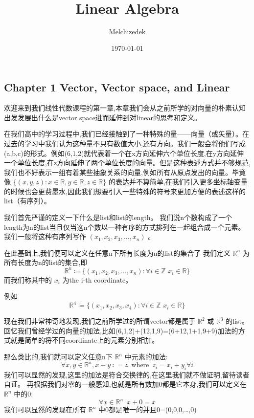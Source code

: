 \documentclass{ctexart}
\title{Linear Algebra}
\author{Melchizedek}
\date{\today}
\begin{document}
\maketitle

\newpage
\subsection*{Chapter 1 Vector, Vector space, and Linear}

欢迎来到我们线性代数课程的第一章,本章我们会从之前所学的对向量的朴素认知出发发展出什么是vector space进而延伸到对linear的思考和定义。

在我们高中的学习过程中,我们已经接触到了一种特殊的量——向量（或矢量）。在过去的学习中我们认为这种量不只有数值大小,还有方向。我们一般会将他们写成(a,b,c)的形式。例如(6,1,2)就代表着一个在x方向延伸六个单位长度,在y方向延伸一个单位长度,在z方向延伸了两个单位长度的向量。但是这种表述方式并不够规范,我们也不好表示一组有着某些抽象关系的向量,例如所有从原点发出的向量。毕竟像 $ \{(x,y,z):x\in  \mathbb{R},y\in \mathbb{R},z \in \mathbb{R} \} $ 的表达并不算简单,在我们引入更多坐标轴变量的时候也会更费墨水,因此我们想要引入一些特殊的符号来更加方便的表述这样的list（有序列）。

我们首先严谨的定义一下什么是list和list的length。
我们说n个数构成了一个length为n的list当且仅当这n个数以一种有序的方式排列在一起组合成一个元素。
我们一般将这种有序列写作 $ (x_1,x_2,x_3,…,x_n) $ 。

在此基础上,我们便可以定义在任意n下所有长度为n的list的集合了
我们定义 $ \mathbb{R}^n $ 为所有长度为n的list的集合,即
 $$ \mathbb{R}^n≔\{(x_1,x_2,x_3,…,x_n):\forall i\in \mathbb{Z} \,\, x_i\in  \mathbb{R} \} $$ 
而我们称其中的 $ x_i $ 为the i-th coordinate。

例如
 $$ \mathbb{R}^4≔\{(x_1,x_2,x_3,x_4):\forall i\in \mathbb{Z} \,\, x_i\in  \mathbb{R} \} $$ 

现在我们非常神奇地发现,我们之前所学过的所谓vector都是属于 $\mathbb{R}^2$ 或 $\mathbb{R}^3$ 的list。回忆我们曾经学过的向量的加法,比如(6,1,2)+(12,1,9)=(6+12,1+1,9+9)加法的方式就是简单的将不同coordinate上的元素分别相加。

那么类比的,我们就可以定义任意n下 $\mathbb{R}^n$ 中元素的加法:
 $$ \forall x,y\in \mathbb{R}^n,x+y∶=z \,\,\, \text{where} \,\,\, z_i=x_i+y_i  \forall i $$ 
我们可以显然的发现,这里的加法是符合交换律的,在这里我们就不做证明,留待读者自证。
再根据我们对零的一般感知,也就是所有数加0都是它本身,我们可以定义在 $\mathbb{R}^n$ 中的0:
 $$ \forall x\in \mathbb{R}^n \,\,\,  x+0=x $$ 
我们可以显然的发现在所有 $\mathbb{R}^n$ 中0都是唯一的并且0=(0,0,0,…,0)
\end{document}
